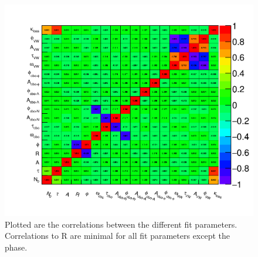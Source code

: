 	\begin{figure}[]
		\centering
		\includegraphics[width=\textwidth]{CorrelationMatrixTMethod}
	    \caption[CorrelationMatrixTMethod]{Plotted are the correlations between the different fit parameters. Correlations to R are minimal for all fit parameters except the \gmtwo phase.}
	    \label{fig:CorrelationMatrixTMethod}
	\end{figure}

